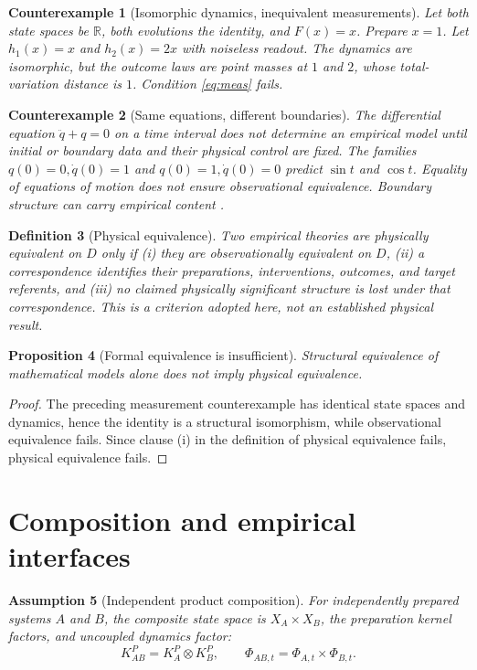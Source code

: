 \documentclass[11pt]{article}
\newtheorem{definition}{Definition}[section]
\newtheorem{assumption}[definition]{Assumption}
\newtheorem{proposition}[definition]{Proposition}
\newtheorem{counterexample}[definition]{Counterexample}
\newcommand{\R}{\mathbb R}
\begin{document}
\begin{counterexample}[Isomorphic dynamics, inequivalent measurements]
Let both state spaces be $\R$, both evolutions the identity, and $F(x)=x$.  Prepare $x=1$.  Let $h_1(x)=x$ and $h_2(x)=2x$ with noiseless readout.  The dynamics are isomorphic, but the outcome laws are point masses at $1$ and $2$, whose total-variation distance is $1$.  Condition \eqref{eq:meas} fails.
\end{counterexample}

\begin{counterexample}[Same equations, different boundaries]
The differential equation $\ddot q+q=0$ on a time interval does not determine an empirical model until initial or boundary data and their physical control are fixed.  The families $q(0)=0,\dot q(0)=1$ and $q(0)=1,\dot q(0)=0$ predict $\sin t$ and $\cos t$.  Equality of equations of motion does not ensure observational equivalence.  Boundary structure can carry empirical content \cite{WolfRead2023}.
\end{counterexample}

\begin{definition}[Physical equivalence]
Two empirical theories are physically equivalent on $D$ only if (i) they are observationally equivalent on $D$, (ii) a correspondence identifies their preparations, interventions, outcomes, and target referents, and (iii) no claimed physically significant structure is lost under that correspondence.  This is a criterion adopted here, not an established physical result.
\end{definition}

\begin{proposition}[Formal equivalence is insufficient]
Structural equivalence of mathematical models alone does not imply physical equivalence.
\end{proposition}
\begin{proof}
The preceding measurement counterexample has identical state spaces and dynamics, hence the identity is a structural isomorphism, while observational equivalence fails.  Since clause (i) in the definition of physical equivalence fails, physical equivalence fails.
\end{proof}

\section{Composition and empirical interfaces}

\begin{assumption}[Independent product composition]
For independently prepared systems $A$ and $B$, the composite state space is $X_A\times X_B$, the preparation kernel factors, and uncoupled dynamics factor:
\[
 K^P_{AB}=K^P_A\otimes K^P_B,
 \qquad \Phi_{AB,t}=\Phi_{A,t}\times\Phi_{B,t}.
\]
\end{assumption}
\end{document}
